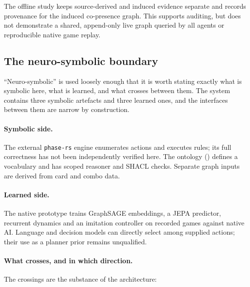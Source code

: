 \documentclass[11pt,a4paper]{article}
\theoremstyle{definition}
\theoremstyle{plain}
\begin{document}
The offline study keeps source-derived and induced evidence separate and records provenance for the induced co-presence graph. This supports auditing, but does not demonstrate a shared, append-only live graph queried by all agents or reproducible native game replay.

\subsection{The neuro-symbolic boundary}
\label{sec:neurosymbolic}

``Neuro-symbolic'' is used loosely enough that it is worth stating exactly what is symbolic here, what is learned, and what crosses between them. The system contains three symbolic artefacts and three learned ones, and the interfaces between them are narrow by construction.

\paragraph{Symbolic side.} The external \texttt{phase-rs} engine enumerates actions and executes rules; its full correctness has not been independently verified here. The ontology () defines a vocabulary and has scoped reasoner and SHACL checks. Separate graph inputs are derived from card and combo data.

\paragraph{Learned side.} The native prototype trains GraphSAGE embeddings, a JEPA predictor, recurrent dynamics and an imitation controller on recorded games against native AI. Language and decision models can directly select among supplied actions; their use as a planner prior remains unqualified.

\paragraph{What crosses, and in which direction.} The crossings are the substance of the architecture:
\end{document}
